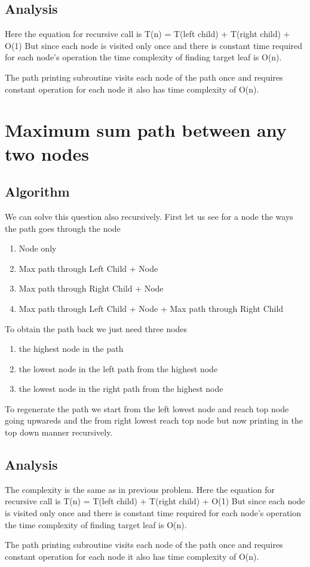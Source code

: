 \documentclass[12pt]{article}
\begin{document}
\subsection*{Analysis}

Here the equation for recursive call is T(n) = T(left child) + T(right child) + O(1)
But since each node is visited only once and there is constant time required for each node's operation the time complexity of finding target leaf is O(n).

The path printing subroutine visits each node of the path once and requires constant operation for each node it also has time complexity of O(n).

\section*{Maximum sum path between any two nodes}

\subsection*{Algorithm}
We can solve this question also recursively.
First let us see for a node the ways the path goes through the node

\begin{enumerate}
\item  Node only
\item Max path through Left Child + Node
\item Max path through Right Child + Node
\item Max path through Left Child + Node + Max path through Right Child

\end{enumerate}

To obtain the path back we just need three nodes

\begin{enumerate}
\item  the highest node in the path
\item the lowest node in the left path from the highest node
\item the lowest node in the right path from the highest node

\end{enumerate}
To regenerate the path we start from the left lowest node and reach top node going upwareds and the from right lowest reach top node but now printing in the top down manner recursively.

\subsection*{Analysis}
The complexity is the same as in previous problem.
Here the equation for recursive call is T(n) = T(left child) + T(right child) + O(1)
But since each node is visited only once and there is constant time required for each node's operation the time complexity of finding target leaf is O(n).

The path printing subroutine visits each node of the path once and requires constant operation for each node it also has time complexity of O(n).
\end{document}
